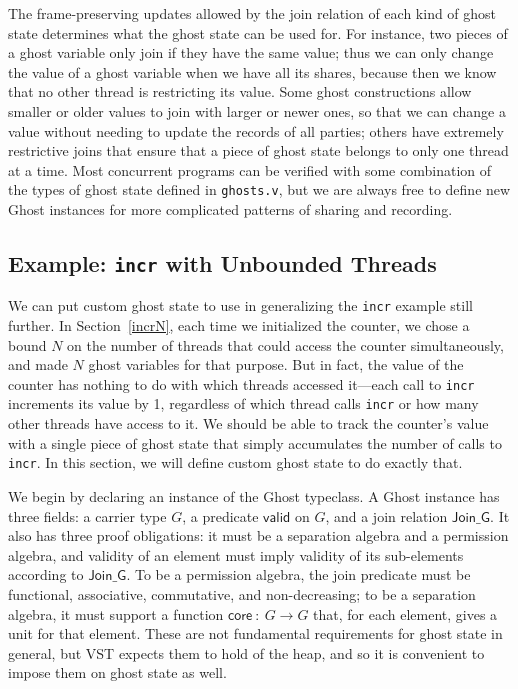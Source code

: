\documentclass[11pt]{article} %
\begin{document}
The frame-preserving updates allowed by the join relation of each kind of ghost state determines what the ghost state can be used for. For instance, two pieces of a ghost variable only join if they have the same value; thus we can only change the value of a ghost variable when we have all its shares, because then we know that no other thread is restricting its value. Some ghost constructions allow smaller or older values to join with larger or newer ones, so that we can change a value without needing to update the records of all parties; others have extremely restrictive joins that ensure that a piece of ghost state belongs to only one thread at a time. Most concurrent programs can be verified with some combination of the types of ghost state defined in \texttt{ghosts.v}, but we are always free to define new \textsf{Ghost} instances for more complicated patterns of sharing and recording.

\subsection{Example: \texttt{incr} with Unbounded Threads}
\label{incr-gen}
We can put custom ghost state to use in generalizing the \texttt{incr} example still further. In Section~\ref{incrN}, each time we initialized the counter, we chose a bound $N$ on the number of threads that could access the counter simultaneously, and made $N$ ghost variables for that purpose. But in fact, the value of the counter has nothing to do with which threads accessed it---each call to \texttt{incr} increments its value by 1, regardless of which thread calls \texttt{incr} or how many other threads have access to it. We should be able to track the counter's value with a single piece of ghost state that simply accumulates the number of calls to \texttt{incr}. In this section, we will define custom ghost state to do exactly that.

We begin by declaring an instance of the \textsf{Ghost} typeclass. A \textsf{Ghost} instance has three fields: a carrier type $G$, a predicate $\mathsf{valid}$ on $G$, and a join relation $\mathsf{Join\_G}$. It also has three proof obligations: it must be a separation algebra and a permission algebra, and validity of an element must imply validity of its sub-elements according to $\mathsf{Join\_G}$. To be a permission algebra, the join predicate must be functional, associative, commutative, and non-decreasing; to be a separation algebra, it must support a function $\mathsf{core}\ :\ G \rightarrow G$ that, for each element, gives a unit for that element. These are not fundamental requirements for ghost state in general, but VST expects them to hold of the heap, and so it is convenient to impose them on ghost state as well.
\end{document}
